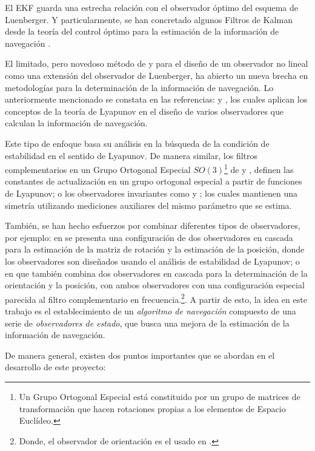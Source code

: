 \documentclass[conference]{IEEEtran}
\begin{document}
El EKF guarda una estrecha relación con el observador óptimo del esquema de Luenberger. Y particularmente, se han concretado algunos Filtros de Kalman desde la teoría del control óptimo para la estimación de la información de navegación \cite{Smith1995}.\par
%
El limitado, pero novedoso método de \cite{Kou1975} y \cite{Thau1973} para el diseño de un observador no lineal como una extensión del observador de Luenberger, ha abierto un nueva brecha en metodologías para la determinación de la información de navegación. Lo anteriormente mencionado se constata en las referencias: \cite{Vik2001,Thienel2003} y \cite{Hua2009}, los cuales aplican los conceptos de la teoría de Lyapunov en el diseño de varios observadores que calculan la información de navegación.\par
Este tipo de enfoque basa su análisis en la búsqueda de la condición de estabilidad en el sentido de Lyapunov. De manera similar, los filtros complementarios en un Grupo Ortogonal Especial $SO(3)$\footnote{Un Grupo Ortogonal Especial está constituido por un grupo de matrices de transformación que hacen rotaciones propias a los elementos de Espacio Euclídeo.} de \cite{Mahony2008} y \cite{Scandaro2011}, definen las constantes de actualización en un grupo ortogonal especial a partir de funciones de Lyapunov; o los observadores invariantes como \cite{Bonabel2008} y \cite{Martin2008}; los cuales mantienen una simetría utilizando mediciones auxiliares del mismo parámetro que se estima. %
\par
%
También, se han hecho esfuerzos por combinar diferentes tipos de observadores, por ejemplo: en \cite{Vasconcelos2008} se presenta una configuración de dos observadores en cascada para la estimación de la matriz de rotación y la estimación de la posición, donde los observadores son diseñados usando el análisis de estabilidad de Lyapunov; o en \cite{Scandaro2011} que también combina dos observadores en cascada para la determinación de la orientación y la posición, con ambos observadores con una configuración especial parecida al filtro complementario en frecuencia.\footnote{Donde, el observador de orientación es el usado en \cite{Mahony2008}. }. A partir de esto, la idea en este trabajo es el establecimiento de un \emph{algoritmo de navegación} compuesto de una serie de \emph{observadores de estado}, que busca una mejora de la estimación de la información de navegación.\par
De manera general, existen dos puntos importantes que se abordan en el desarrollo de este proyecto:
\end{document}
